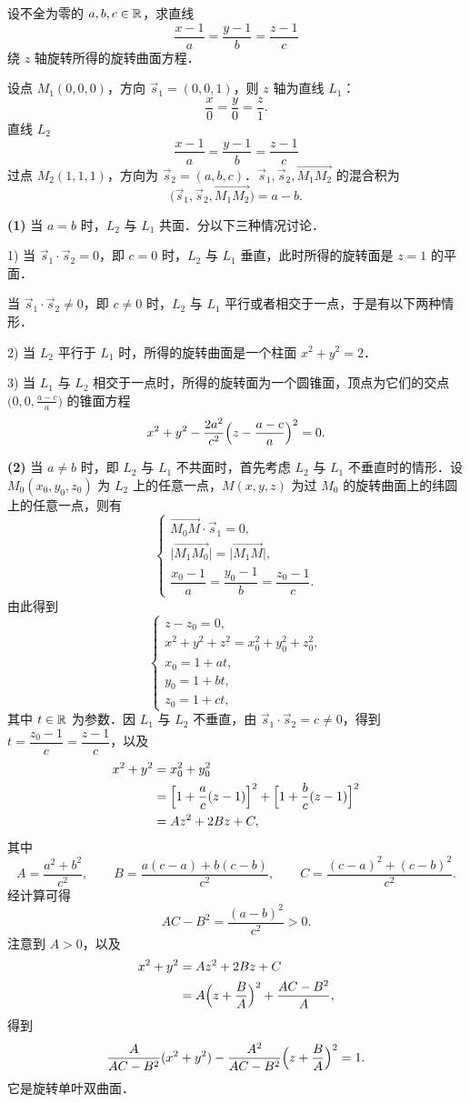 
设不全为零的 $a,b,c\in\mathbb{R}$，求直线
\[
  \frac{x-1}{a}=\frac{y-1}{b}=\frac{z-1}{c}
\]
绕 $z$ 轴旋转所得的旋转曲面方程．

\begin{solution}
设点 $M_1(0,0,0)$，方向 $\vec s_1=(0,0,1)$，则 $z$ 轴为直线 $L_1$：
\[
  \frac{x}{0}=\frac{y}{0}=\frac{z}{1}.
\]
直线 $L_2$
\[
  \frac{x-1}{a}=\frac{y-1}{b}=\frac{z-1}{c}
\]
过点 $M_2(1,1,1)$，方向为 $\vec s_2=(a,b,c)$．$\vec s_1,\vec s_2,\overrightarrow{M_1M_2}$ 的混合积为
\[
  \bigl(\vec s_1,\vec s_2,\overrightarrow{M_1M_2}\bigr)=a-b.
\]

\textbf{(1)} 当 $a=b$ 时，$L_2$ 与 $L_1$ 共面．分以下三种情况讨论．

1) 当 $\vec s_1\cdot\vec s_2=0$，即 $c=0$ 时，$L_2$ 与 $L_1$ 垂直，此时所得的旋转面是 $z=1$ 的平面．

当 $\vec s_1\cdot\vec s_2\ne 0$，即 $c\ne 0$ 时，$L_2$ 与 $L_1$ 平行或者相交于一点，于是有以下两种情形．

2) 当 $L_2$ 平行于 $L_1$ 时，所得的旋转曲面是一个柱面 $x^2+y^2=2$．

3) 当 $L_1$ 与 $L_2$ 相交于一点时，所得的旋转面为一个圆锥面，顶点为它们的交点 $\bigl(0,0,\frac{a-c}{a}\bigr)$ 的锥面方程
\[
  x^2+y^2-\frac{2a^2}{c^2}\Bigl(z-\frac{a-c}{a}\Bigr)^2=0.
\]

\textbf{(2)} 当 $a\ne b$ 时，即 $L_2$ 与 $L_1$ 不共面时，首先考虑 $L_2$ 与 $L_1$ 不垂直时的情形．设 $M_0(x_0,y_0,z_0)$ 为 $L_2$ 上的任意一点，$M(x,y,z)$ 为过 $M_0$ 的旋转曲面上的纬圆上的任意一点，则有
\[
  \begin{cases}
    \overrightarrow{M_0M}\cdot\vec s_1=0,\\[2pt]
    \bigl|\overrightarrow{M_1M_0}\bigr|=\bigl|\overrightarrow{M_1M}\bigr|,\\[2pt]
    \dfrac{x_0-1}{a}=\dfrac{y_0-1}{b}=\dfrac{z_0-1}{c}.
  \end{cases}
\]
由此得到
\[
  \begin{cases}
    z-z_0=0,\\
    x^2+y^2+z^2=x_0^2+y_0^2+z_0^2,\\
    x_0=1+at,\\
    y_0=1+bt,\\
    z_0=1+ct,
  \end{cases}
\]
其中 $t\in\mathbb{R}$ 为参数．因 $L_1$ 与 $L_2$ 不垂直，由 $\vec s_1\cdot\vec s_2=c\ne 0$，得到 $t=\dfrac{z_0-1}{c}=\dfrac{z-1}{c}$，以及
\begin{align*}
  x^2+y^2&=x_0^2+y_0^2\\
  &=\Bigl[1+\frac{a}{c}(z-1)\Bigr]^2+\Bigl[1+\frac{b}{c}(z-1)\Bigr]^2\\
  &=Az^2+2Bz+C,
\end{align*}
其中
\[
  A=\frac{a^2+b^2}{c^2},\qquad
  B=\frac{a(c-a)+b(c-b)}{c^2},\qquad
  C=\frac{(c-a)^2+(c-b)^2}{c^2}.
\]
经计算可得
\[
  AC-B^2=\frac{(a-b)^2}{c^2}>0.
\]
注意到 $A>0$，以及
\begin{align*}
  x^2+y^2&=Az^2+2Bz+C\\
  &=A\Bigl(z+\frac{B}{A}\Bigr)^2+\frac{AC-B^2}{A},
\end{align*}
得到
\[
  \frac{A}{AC-B^2}(x^2+y^2)-\frac{A^2}{AC-B^2}\Bigl(z+\frac{B}{A}\Bigr)^2=1.
\]
它是旋转单叶双曲面．


\end{solution}
